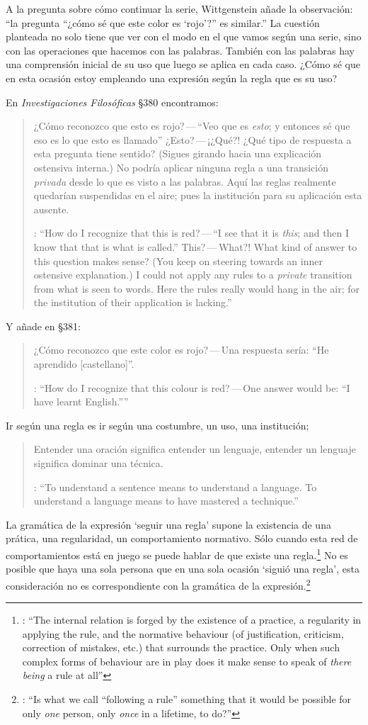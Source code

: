 A la pregunta sobre cómo continuar la serie, Wittgenstein añade la observación: \enquote{la pregunta ``¿cómo sé que este color es `rojo'?'' es similar.} La cuestión planteada no solo tiene que ver con el modo en el que vamos según una serie, sino con las operaciones que hacemos con las palabras. También con las palabras hay una comprensión inicial de su uso que luego se aplica en cada caso. ¿Cómo sé que en esta ocasión estoy empleando una expresión según la regla que es su uso?

En \emph{Investigaciones Filosóficas} \S380 encontramos: \blockquote[{\cite[\S380]{wittgenstein1953phiinv}}: \enquote{How do I recognize that this is red?\,---\,``I see that it is \emph{this}; and then I know that that is what is called.'' This?\,---\,What?! What kind of answer to this question makes sense? (You keep on steering towards an inner ostensive explanation.) I could not apply any rules to a \emph{private} transition from what is seen to words. Here the rules really would hang in the air; for the institution of their application is lacking.}]{¿Cómo reconozco que esto es rojo?\,---\,``Veo que es \emph{esto}; y entonces sé que eso es lo que esto es llamado'' ¿Esto?\,---\,¡¿Qué?! ¿Qué tipo de respuesta a esta pregunta tiene sentido? (Sigues girando hacia una explicación ostensiva interna.) No podría aplicar ninguna regla a una transición \emph{privada} desde lo que es visto a las palabras. Aquí las reglas realmente quedarían suspendidas en el aire; pues la institución para su aplicación esta ausente.}

Y añade en \S381: \blockquote[{\cite[\S380]{wittgenstein1953phiinv}}: \enquote{How do I recognize that this colour is red?\,---\,One answer would be: ``I have learnt English.''}]{¿Cómo reconozco que este color es rojo?\,---\,Una respuesta sería: ``He aprendido [castellano]''.} Ir según una regla es ir según una costumbre, un uso, una institución; \blockquote[{\cite[\S199]{wittgenstein1953phiinv}}: \enquote{To understand a sentence means to understand a language. To understand a language means to have mastered a technique.}]{Entender una oración significa entender un lenguaje, entender un lenguaje significa dominar una técnica.} La gramática de la expresión `seguir una regla' supone la existencia de una prática, una regularidad, un comportamiento normativo. Sólo cuando esta red de comportamientos está en juego se puede hablar de que existe una regla.\footnote{\cite[Cf.~][p.~14]{bakerhacker2009understanding}: \enquote{The internal relation is forged by the existence of a practice, a regularity in applying the rule, and the normative behaviour (of justification, criticism, correction of mistakes, etc.) that surrounds the practice. Only when such complex forms of behaviour are in play does it make sense to speak of \emph{there being} a rule at all}} No es posible que haya una sola persona que en una sola ocasión `siguió una regla', esta consideración no es correspondiente con la gramática de la expresión.\footnote{\cite[Cf.~][\S199]{wittgenstein1953phiinv}: \enquote{Is what we call ``following a rule'' something that it would be possible for only \emph{one} person, only \emph{once} in a lifetime, to do?}}

